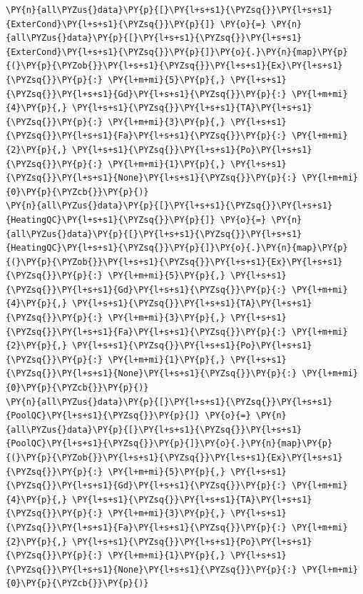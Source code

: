 \documentclass[no-math]{YangThesis}
\begin{document}
\begin{tcolorbox}[breakable, size=fbox, boxrule=1pt, pad at break*=1mm,colback=cellbackground, colframe=cellborder]
\begin{Verbatim}[commandchars=\\\{\}]
\PY{n}{all\PYZus{}data}\PY{p}{[}\PY{l+s+s1}{\PYZsq{}}\PY{l+s+s1}{ExterCond}\PY{l+s+s1}{\PYZsq{}}\PY{p}{]} \PY{o}{=} \PY{n}{all\PYZus{}data}\PY{p}{[}\PY{l+s+s1}{\PYZsq{}}\PY{l+s+s1}{ExterCond}\PY{l+s+s1}{\PYZsq{}}\PY{p}{]}\PY{o}{.}\PY{n}{map}\PY{p}{(}\PY{p}{\PYZob{}}\PY{l+s+s1}{\PYZsq{}}\PY{l+s+s1}{Ex}\PY{l+s+s1}{\PYZsq{}}\PY{p}{:} \PY{l+m+mi}{5}\PY{p}{,} \PY{l+s+s1}{\PYZsq{}}\PY{l+s+s1}{Gd}\PY{l+s+s1}{\PYZsq{}}\PY{p}{:} \PY{l+m+mi}{4}\PY{p}{,} \PY{l+s+s1}{\PYZsq{}}\PY{l+s+s1}{TA}\PY{l+s+s1}{\PYZsq{}}\PY{p}{:} \PY{l+m+mi}{3}\PY{p}{,} \PY{l+s+s1}{\PYZsq{}}\PY{l+s+s1}{Fa}\PY{l+s+s1}{\PYZsq{}}\PY{p}{:} \PY{l+m+mi}{2}\PY{p}{,} \PY{l+s+s1}{\PYZsq{}}\PY{l+s+s1}{Po}\PY{l+s+s1}{\PYZsq{}}\PY{p}{:} \PY{l+m+mi}{1}\PY{p}{,} \PY{l+s+s1}{\PYZsq{}}\PY{l+s+s1}{None}\PY{l+s+s1}{\PYZsq{}}\PY{p}{:} \PY{l+m+mi}{0}\PY{p}{\PYZcb{}}\PY{p}{)}
\PY{n}{all\PYZus{}data}\PY{p}{[}\PY{l+s+s1}{\PYZsq{}}\PY{l+s+s1}{HeatingQC}\PY{l+s+s1}{\PYZsq{}}\PY{p}{]} \PY{o}{=} \PY{n}{all\PYZus{}data}\PY{p}{[}\PY{l+s+s1}{\PYZsq{}}\PY{l+s+s1}{HeatingQC}\PY{l+s+s1}{\PYZsq{}}\PY{p}{]}\PY{o}{.}\PY{n}{map}\PY{p}{(}\PY{p}{\PYZob{}}\PY{l+s+s1}{\PYZsq{}}\PY{l+s+s1}{Ex}\PY{l+s+s1}{\PYZsq{}}\PY{p}{:} \PY{l+m+mi}{5}\PY{p}{,} \PY{l+s+s1}{\PYZsq{}}\PY{l+s+s1}{Gd}\PY{l+s+s1}{\PYZsq{}}\PY{p}{:} \PY{l+m+mi}{4}\PY{p}{,} \PY{l+s+s1}{\PYZsq{}}\PY{l+s+s1}{TA}\PY{l+s+s1}{\PYZsq{}}\PY{p}{:} \PY{l+m+mi}{3}\PY{p}{,} \PY{l+s+s1}{\PYZsq{}}\PY{l+s+s1}{Fa}\PY{l+s+s1}{\PYZsq{}}\PY{p}{:} \PY{l+m+mi}{2}\PY{p}{,} \PY{l+s+s1}{\PYZsq{}}\PY{l+s+s1}{Po}\PY{l+s+s1}{\PYZsq{}}\PY{p}{:} \PY{l+m+mi}{1}\PY{p}{,} \PY{l+s+s1}{\PYZsq{}}\PY{l+s+s1}{None}\PY{l+s+s1}{\PYZsq{}}\PY{p}{:} \PY{l+m+mi}{0}\PY{p}{\PYZcb{}}\PY{p}{)}
\PY{n}{all\PYZus{}data}\PY{p}{[}\PY{l+s+s1}{\PYZsq{}}\PY{l+s+s1}{PoolQC}\PY{l+s+s1}{\PYZsq{}}\PY{p}{]} \PY{o}{=} \PY{n}{all\PYZus{}data}\PY{p}{[}\PY{l+s+s1}{\PYZsq{}}\PY{l+s+s1}{PoolQC}\PY{l+s+s1}{\PYZsq{}}\PY{p}{]}\PY{o}{.}\PY{n}{map}\PY{p}{(}\PY{p}{\PYZob{}}\PY{l+s+s1}{\PYZsq{}}\PY{l+s+s1}{Ex}\PY{l+s+s1}{\PYZsq{}}\PY{p}{:} \PY{l+m+mi}{5}\PY{p}{,} \PY{l+s+s1}{\PYZsq{}}\PY{l+s+s1}{Gd}\PY{l+s+s1}{\PYZsq{}}\PY{p}{:} \PY{l+m+mi}{4}\PY{p}{,} \PY{l+s+s1}{\PYZsq{}}\PY{l+s+s1}{TA}\PY{l+s+s1}{\PYZsq{}}\PY{p}{:} \PY{l+m+mi}{3}\PY{p}{,} \PY{l+s+s1}{\PYZsq{}}\PY{l+s+s1}{Fa}\PY{l+s+s1}{\PYZsq{}}\PY{p}{:} \PY{l+m+mi}{2}\PY{p}{,} \PY{l+s+s1}{\PYZsq{}}\PY{l+s+s1}{Po}\PY{l+s+s1}{\PYZsq{}}\PY{p}{:} \PY{l+m+mi}{1}\PY{p}{,} \PY{l+s+s1}{\PYZsq{}}\PY{l+s+s1}{None}\PY{l+s+s1}{\PYZsq{}}\PY{p}{:} \PY{l+m+mi}{0}\PY{p}{\PYZcb{}}\PY{p}{)}

\end{Verbatim}
\end{tcolorbox}
\end{document}
